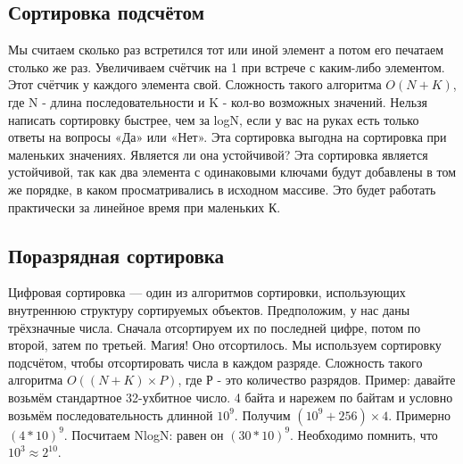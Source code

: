 \documentclass[a4paper,12pt]{article}
\begin{document}
\subsection{Сортировка подсчётом}
Мы считаем сколько раз встретился тот или иной элемент а потом его печатаем столько же раз. Увеличиваем счётчик на 1 при встрече с каким-либо элементом. Этот счётчик у каждого элемента свой. Сложность такого алгоритма $O(N+K)$, где N - длина последовательности и K - кол-во возможных значений. Нельзя написать сортировку быстрее, чем за logN, если у вас на руках есть только ответы на вопросы «Да» или «Нет». Эта сортировка выгодна на сортировка при маленьких значениях. Является ли она устойчивой? Эта сортировка является устойчивой, так как два элемента с одинаковыми ключами будут добавлены в том же порядке, в каком просматривались в исходном массиве. Это будет работать практически за линейное время при маленьких К. 
\subsection{Поразрядная сортировка}
Цифровая сортировка — один из алгоритмов сортировки, использующих внутреннюю структуру сортируемых объектов. Предположим, у нас даны трёхзначные числа. Сначала отсортируем их по последней цифре, потом по второй, затем по третьей. Магия! Оно отсортилось. Мы используем сортировку подсчётом, чтобы отсортировать числа в каждом разряде. Сложность такого алгоритма $O((N+K)\times P)$, где Р - это количество разрядов. Пример: давайте возьмём стандартное 32-ухбитное число. 4 байта и нарежем по байтам и условно возьмём последовательность длинной $10^9$. Получим $(10^9 + 256) \times 4$. Примерно $(4 * 10)^9$. Посчитаем NlogN: равен он $(30 * 10)^9$. Необходимо помнить, что $10^3 \approx 2^{10}$.
\end{document}
